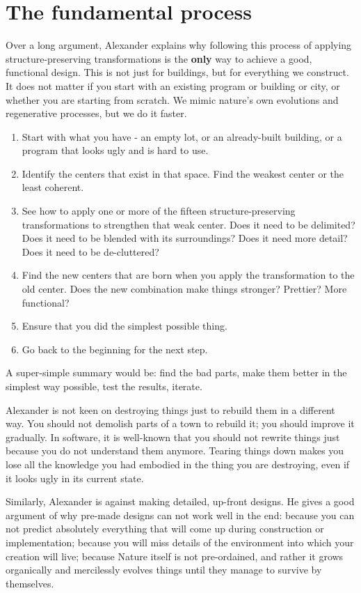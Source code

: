 \section*{The fundamental process}

Over a long argument, Alexander explains why following this process of applying structure-preserving transformations is the \textbf{only} way to achieve a good, functional design. This is not just for buildings, but for everything we construct. It does not matter if you start with an existing program or building or city, or whether you are starting from scratch. We mimic nature's own evolutions and regenerative processes, but we do it faster.
\begin{enumerate}
 \item Start with what you have - an empty lot, or an already-built building, or a program that looks ugly and is hard to use.
 \item Identify the centers that exist in that space. Find the weakest center or the least coherent.
 \item See how to apply one or more of the fifteen structure-preserving transformations to strengthen that weak center. Does it need to be delimited? Does it need to be blended with its surroundings? Does it need more detail? Does it need to be de-cluttered?
 \item Find the new centers that are born when you apply the transformation to the old center. Does the new combination make things stronger? Prettier? More functional?
 \item Ensure that you did the simplest possible thing.
 \item Go back to the beginning for the next step.
\end{enumerate}
A super-simple summary would be: find the bad parts, make them better in the simplest way possible, test the results, iterate.

Alexander is not keen on destroying things just to rebuild them in a different way.  You should  not demolish parts of a town to rebuild it; you should improve it gradually. In software, it is well-known that you should not rewrite things just because you do not understand them anymore. Tearing things down makes you lose all the knowledge you had embodied in the thing you are destroying, even if it looks ugly in its current state.

Similarly, Alexander is against making detailed, up-front designs. He gives a good argument of why pre-made designs can not work well in the end: because you can not predict absolutely everything that will come up during construction or implementation; because you will miss details of the environment into which your creation will live; because Nature itself is not pre-ordained, and rather it grows organically and mercilessly evolves things until they manage to survive by themselves.

